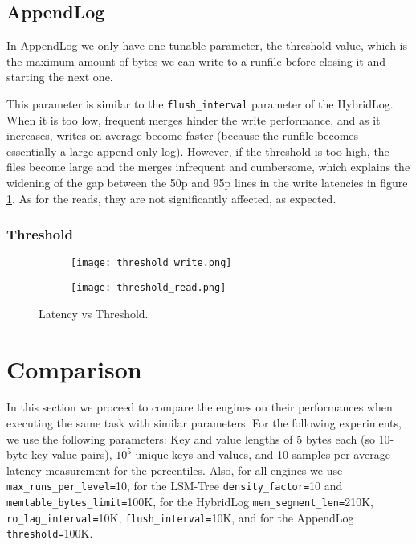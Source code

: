 \subsection{AppendLog}

In AppendLog we only have one tunable parameter, the threshold value, which is the maximum amount of bytes we can write to a runfile before closing it and starting the next one.

This parameter is similar to the \verb"flush_interval" parameter of the HybridLog. When it is too low, frequent merges hinder the write performance, and as it increases, writes on average become faster (because the runfile becomes essentially a large append-only log). However, if the threshold is too high, the files become large and the merges infrequent and cumbersome, which explains the widening of the gap between the 50p and 95p lines in the write latencies in figure \ref{fig:threshold_write_read}. As for the reads, they are not significantly affected, as expected.

\subsubsection{Threshold}

\begin{figure}[h]
    \begin{subfigure}{.5\textwidth}
        \centering
        \texttt{[image: threshold\_write.png]}
    \end{subfigure}
    \begin{subfigure}{.5\textwidth}
        \centering
        \texttt{[image: threshold\_read.png]}
    \end{subfigure}
    \caption{Latency vs Threshold.}
    \label{fig:threshold_write_read}
\end{figure}

\section{Comparison}

In this section we proceed to compare the engines on their performances when executing the same task with similar parameters. For the following experiments, we use the following parameters: Key and value lengths of 5 bytes each (so 10-byte key-value pairs), $10^5$ unique keys and values, and 10 samples per average latency measurement for the percentiles. Also, for all engines we use \verb"max_runs_per_level="10, for the LSM-Tree \verb"density_factor="10 and \verb"memtable_bytes_limit="100K, for the HybridLog \verb"mem_segment_len="210K, \verb"ro_lag_interval="10K, \verb"flush_interval="10K, and for the AppendLog \verb"threshold="100K.

